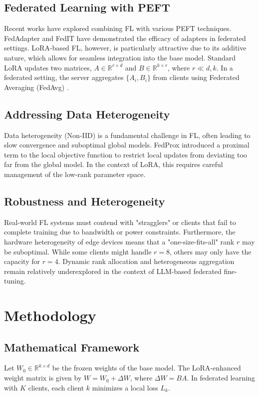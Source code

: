 \documentclass[twocolumn]{article}
\begin{document}
\subsection{Federated Learning with PEFT}
Recent works have explored combining FL with various PEFT techniques. FedAdapter \cite{fedadapter} and FedIT \cite{fedit} have demonstrated the efficacy of adapters in federated settings. LoRA-based FL, however, is particularly attractive due to its additive nature, which allows for seamless integration into the base model. Standard LoRA updates two matrices, $A \in \mathbb{R}^{r \times d}$ and $B \in \mathbb{R}^{k \times r}$, where $r \ll d, k$. In a federated setting, the server aggregates $\{A_i, B_i\}$ from clients using Federated Averaging (FedAvg) \cite{fedavg}.

\subsection{Addressing Data Heterogeneity}
Data heterogeneity (Non-IID) is a fundamental challenge in FL, often leading to slow convergence and suboptimal global models. FedProx \cite{fedprox} introduced a proximal term to the local objective function to restrict local updates from deviating too far from the global model. In the context of LoRA, this requires careful management of the low-rank parameter space.

\subsection{Robustness and Heterogeneity}
Real-world FL systems must contend with "stragglers" or clients that fail to complete training due to bandwidth or power constraints. Furthermore, the hardware heterogeneity of edge devices means that a "one-size-fits-all" rank $r$ may be suboptimal. While some clients might handle $r=8$, others may only have the capacity for $r=4$. Dynamic rank allocation and heterogeneous aggregation remain relatively underexplored in the context of LLM-based federated fine-tuning.

\section{Methodology}
\subsection{Mathematical Framework}
Let $W_0 \in \mathbb{R}^{k \times d}$ be the frozen weights of the base model. The LoRA-enhanced weight matrix is given by $W = W_0 + \Delta W$, where $\Delta W = B A$. In federated learning with $K$ clients, each client $k$ minimizes a local loss $L_k$.
\end{document}
